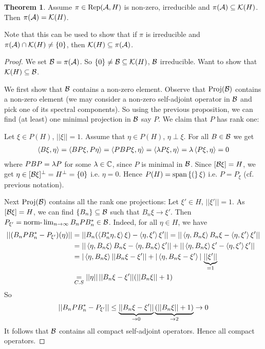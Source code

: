 \documentclass[10pt,english,a4paper]{article}
\theoremstyle{definition}
\newtheorem*{theorem}{Theorem}
\DeclareMathOperator{\Rep}{Rep}
\DeclareMathOperator{\Proj}{Proj}
\begin{document}
\begin{theorem}
    Assume $\pi \in \Rep(\As,H)$ is non-zero, irreducible and $\pi(\mathcal{A}) \subseteq\mathcal{K}(H)$.
Then $\pi(\mathcal{A}) = \mathcal{K}(H)$.
\end{theorem}
Note that this can be used to show that if $\pi$ is irreducible and
$\pi(\mathcal{A})\cap \mathcal{K}(H)\neq \{0\}$, then $\mathcal{K}(H)\subseteq \pi(\mathcal{A})$.
\begin{proof}
    We set $\mathcal{B} = \pi(\mathcal{A})$. So $\{0\}\neq \mathcal{B} \subseteq \mathcal{K}(H)$, $\mathcal{B}$ irreducible.
Want to show that $\mathcal{K}(H)\subseteq \mathcal{B}$. 

We first show that $\mathcal{B}$ contains a non-zero element.
Observe that $\Proj (\Bs)$ contains a non-zero element 
(we may consider a non-zero self-adjoint operator in $\mathcal{B}$ and pick one of its
spectral components). So using the previous proposition, we can find (at least)
one minimal projection in $\mathcal{B}$ say $P$. We claim that $P$ has rank one:

Let $\xi \in P(H)$, $||\xi||=1$. Assume that $\eta \in P(H)$, $\eta\perp\xi$.
For all $B \in \mathcal{B}$ we get 
\begin{align*}
    \left\langle B\xi,\eta \right\rangle = \left\langle BP\xi,P\eta \right\rangle = \langle PBP\xi,\eta \rangle = \left\langle \lambda P\xi, \eta \right\rangle =
\lambda\left\langle P\xi,\eta \right\rangle = 0 
\end{align*}
where $PBP = \lambda P$ for some $\lambda \in \mathbb{C}$, since $P$ is minimal in $\mathcal{B}$.
Since $[\mathcal{B} \xi] = H$, we get $\eta \in [\mathcal{B} \xi]^{\perp} = H^{\perp} = \{0\}$ 
i.e. $\eta = 0$. Hence $P(H) = \text{span} \left\{(\right\}\xi)$ i.e. $P=P_{\xi}$ (cf. previous notation).  

Next $\Proj (\Bs)$ contains all the rank one projections:
Let $\xi' \in H$, $||\xi'||=1$. As $[\mathcal{B}\xi] = H$, we can find $\{B_{n}\} \subseteq \mathcal{B}$
such that $B_n\xi \to \xi'$. Then $P_{\xi'} = \text{norm-}\lim_{n\to\infty}
B_{n}PB_{n}^{*} \in \mathcal{B}$.
Indeed, for all $\eta\in H$, we have
\begin{align*}
    ||(B_nPB_{n}^{*} - P_{\xi'})(\eta)|| 
&= ||B_n(\left\langle B_{n}^*\eta,\xi \right\rangle\xi) - \left\langle \eta,\xi' \right\rangle\xi'|| = 
||\left\langle \eta,B_{n}\xi \right\rangle B_n\xi - \left\langle \eta,\xi' \right\rangle\xi'|| \\
&= ||\left\langle \eta,B_{n}\xi \right\rangle B_n\xi -\left\langle \eta,B_n\xi \right\rangle\xi'|| 
+||\left\langle \eta,B_n\xi \right\rangle\xi'- \left\langle \eta,\xi' \right\rangle\xi'|| \\
&= |\left\langle \eta, B_n\xi \right\rangle||B_n \xi- \xi'|| + |\left\langle \eta,B_n\xi -\xi' \right\rangle|\,\underbrace{||\xi'||}_{=1} \\
&\underset{C.S}{=} ||\eta|| \,||B_n\xi-\xi'|| (||B_n\xi|| + 1)
\end{align*}
So 
\begin{align*}
    ||B_nP B_{n}^{*}-P_{\xi'}|| \leq \underbrace{||B_n\xi - \xi'||}_{\to 0} \underbrace{(||B_n\xi||+1)}_{\to 2}\to 0 
\end{align*}
It follows that $\mathcal{B}$ contains all compact self-adjoint operators. Hence all
compact operators. 
\end{proof}
\end{document}
